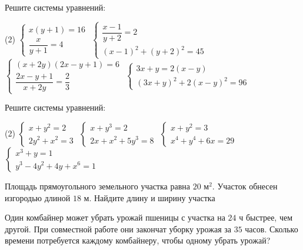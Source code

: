 \begin{class}[number=5]
	\begin{listofex}
		\item Решите системы уравнений:
		\begin{tasks}(2)
			\task \( \begin{cases} x(y+1)=16 \\ \dfrac{ x }{ y+1 }=4 \end{cases} \)
			\task \( \begin{cases} \dfrac{ x-1 }{ y+2 }=2 \\ (x-1)^2+(y+2)^2=45 \end{cases} \)
			\task \( \begin{cases} (x+2y)(2x-y+1)=6 \\ \dfrac{ 2x-y+1 }{ x+2y }=\dfrac{ 2 }{ 3 } \end{cases} \)
			\task \( \begin{cases} 3x+y=2(x-y) \\ (3x+y)^2+2(x-y)^2=96 \end{cases} \)
		\end{tasks}
		\item Решите системы уравнений:
		\begin{tasks}(2)
			\task \( \begin{cases} x+y^2=2 \\ 2y^2+x^2=3 \end{cases} \)
			\task \( \begin{cases} x+y^3=2 \\ 2x+x^2+5y^3=8 \end{cases} \)
			\task \( \begin{cases} x+y^2=3 \\ x^4+y^4+6x=29 \end{cases} \)
			\task \( \begin{cases} x^3+y=1 \\ y^3-4y^2+4y+x^6=1 \end{cases} \)
		\end{tasks}
		\item Площадь прямоугольного земельного участка равна \(20\) м\(^2\). Участок обнесен изгородью длиной \(18\) м. Найдите длину и ширину участка
		\item Один комбайнер может убрать урожай пшеницы с участка на \(24\) ч быстрее, чем другой. При совместной работе они закончат уборку урожая за \(35\) часов. Сколько времени потребуется каждому комбайнеру, чтобы одному убрать урожай?
	\end{listofex}
\end{class}

